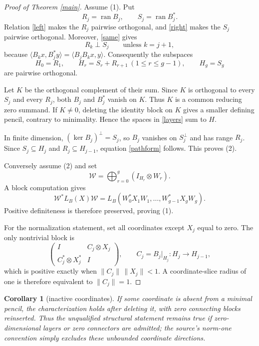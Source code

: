 \documentclass[11pt]{article}
\newtheorem{corollary}[theorem]{Corollary}
\newcommand{\C}{\mathbb C}
\newcommand{\ran}{\operatorname{ran}}
\begin{document}
\begin{proof}[Proof of Theorem \ref{main}]
Assume (1).  Put
\[
 R_j=\ran B_j,
 \qquad S_j=\ran B_j^*.
\]
Relation \eqref{left} makes the $R_j$ pairwise orthogonal, and
\eqref{right} makes the $S_j$ pairwise orthogonal.  Moreover,
\eqref{same} gives
\[
 R_k\perp S_j\qquad\text{unless }k=j+1,
\]
because
$\langle B_kx,B_j^*y\rangle=\langle B_jB_kx,y\rangle$.
Consequently the subspaces
\begin{equation}\label{layers}
 H_0=R_1,\qquad
 H_r=S_r+R_{r+1}\ (1\le r\le g-1),\qquad
 H_g=S_g
\end{equation}
are pairwise orthogonal.

Let $K$ be the orthogonal complement of their sum.  Since $K$ is orthogonal
to every $S_j$ and every $R_j$, both $B_j$ and $B_j^*$ vanish on $K$.
Thus $K$ is a common reducing zero summand.  If $K\ne0$, deleting the identity
block on $K$ gives a smaller defining pencil, contrary to minimality.  Hence
the spaces in \eqref{layers} sum to $H$.

In finite dimension, $(\ker B_j)^\perp=S_j$, so $B_j$ vanishes on
$S_j^\perp$ and has range $R_j$.  Since $S_j\subseteq H_j$ and
$R_j\subseteq H_{j-1}$, equation \eqref{pathform} follows.  This proves (2).

Conversely assume (2) and set
\[
 \mathcal W=\bigoplus_{r=0}^g(I_{H_r}\otimes W_r).
\]
A block computation gives
\[
 \mathcal W^*L_B(X)\mathcal W
 =L_B(W_0^*X_1W_1,\ldots,W_{g-1}^*X_gW_g).
\]
Positive definiteness is therefore preserved, proving (1).

For the normalization statement, set all coordinates except $X_j$ equal to
zero.  The only nontrivial block is
\[
 \begin{pmatrix}I&C_j\otimes X_j\\C_j^*\otimes X_j^*&I\end{pmatrix},
 \qquad C_j=B_j|_{H_j}:H_j\to H_{j-1},
\]
which is positive exactly when $\|C_j\|\,\|X_j\|<1$.  A coordinate-slice
radius of one is therefore equivalent to $\|C_j\|=1$.
\end{proof}

\begin{corollary}[inactive coordinates]
If some coordinate is absent from a minimal pencil, the characterization
holds after deleting it, with zero connecting blocks reinserted.  Thus the
unqualified structural statement remains true if zero-dimensional layers or
zero connectors are admitted; the source's norm-one convention simply
excludes these unbounded coordinate directions.
\end{corollary}
\end{document}
